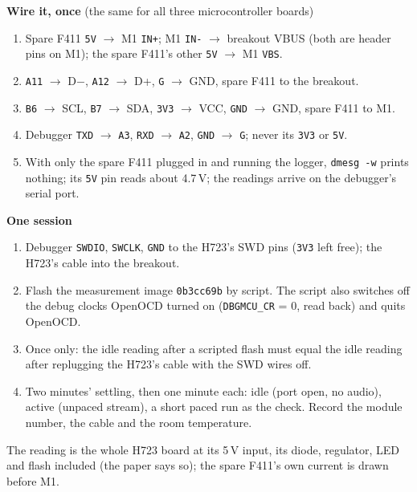 \documentclass[11pt]{article}
\newcommand{\code}[1]{\texttt{#1}}
\begin{document}
\begin{center}
\end{center}

\vspace{-1.2em}
{\small
\begin{minipage}[t]{0.48\linewidth}
\textbf{Wire it, once} (the same for all three microcontroller boards)
\begin{enumerate}
\item Spare F411 \code{5V} $\to$ M1 \code{IN+}; M1 \code{IN-} $\to$ breakout VBUS (both are header pins on M1);
the spare F411's other \code{5V} $\to$ M1 \code{VBS}.
\item \code{A11} $\to$ D$-$, \code{A12} $\to$ D+, \code{G} $\to$ GND, spare F411 to the breakout.
\item \code{B6} $\to$ SCL, \code{B7} $\to$ SDA, \code{3V3} $\to$ VCC, \code{GND} $\to$ GND, spare F411 to M1.
\item Debugger \code{TXD} $\to$ \code{A3}, \code{RXD} $\to$ \code{A2}, \code{GND} $\to$ \code{G}; never its \code{3V3} or
\code{5V}.
\item With only the spare F411 plugged in and running the logger, \code{dmesg -w} prints nothing; its \code{5V} pin reads
about 4.7\,V; the readings arrive on the debugger's serial port.
\end{enumerate}
\end{minipage}\hfill
\begin{minipage}[t]{0.49\linewidth}
\textbf{One session}
\begin{enumerate}
\item Debugger \code{SWDIO}, \code{SWCLK}, \code{GND} to the H723's SWD pins (\code{3V3} left free); the H723's cable into
the breakout.
\item Flash the measurement image \code{0b3cc69b} by script. The script also switches off the debug clocks OpenOCD turned
on (\code{DBGMCU\_CR} = 0, read back) and quits OpenOCD.
\item Once only: the idle reading after a scripted flash must equal the idle reading after replugging the H723's cable
with the SWD wires off.
\item Two minutes' settling, then one minute each: idle (port open, no audio), active (unpaced stream), a short paced run
as the check. Record the module number, the cable and the room temperature.
\end{enumerate}
\end{minipage}}

\vspace{0.2em}
{\scriptsize\color{black!60} The reading is the whole H723 board at its 5\,V input, its diode, regulator, LED and flash included (the paper says so);
the spare F411's own current is drawn before M1.}
\end{document}
